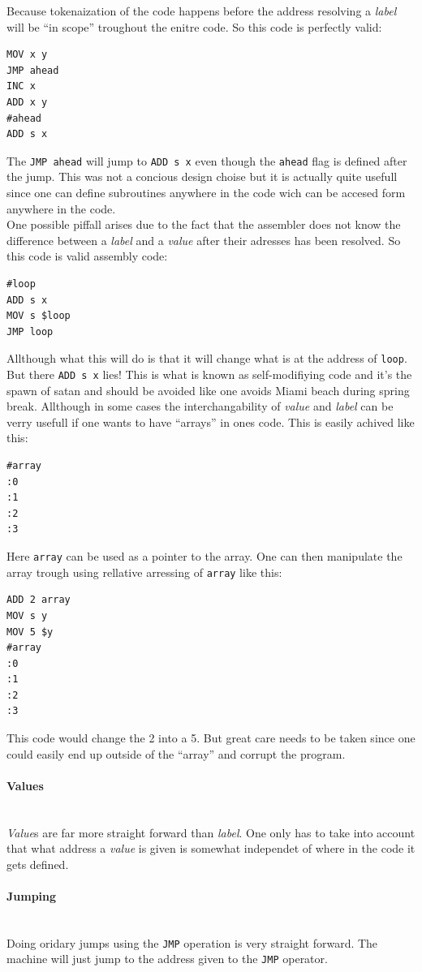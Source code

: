 \documentclass{article}
\newcommand{\V}{\verb}
\begin{document}
Because tokenaization of the code happens before the address resolving a \emph{label}
will be ``in scope'' troughout the enitre code. So this code is perfectly valid:

\begin{verbatim}
MOV x y
JMP ahead
INC x
ADD x y
#ahead
ADD s x
\end{verbatim}
The \V+JMP ahead+ will jump to \V+ADD s x+ even though the \V+ahead+ flag is
defined after the jump. This was not a concious design choise but it is actually
quite usefull since one can define subroutines anywhere in the code wich can be
accesed form anywhere in the code.\\
One possible piffall arises due to the fact that the assembler does not know the
difference between a \emph{label} and a \emph{value} after their adresses has been resolved.
So this code is valid assembly code:
\begin{verbatim}
#loop
ADD s x
MOV s $loop
JMP loop
\end{verbatim}
Allthough what this will do is that it will change what is at the address of
\V+loop+. But there \V+ADD s x+ lies! This is what is known as self-modifiying
code and it's the spawn of satan and should be avoided like one avoids Miami
beach during spring break. Allthough in some cases the interchangability of
\emph{value} and \emph{label} can be verry usefull if one wants to have ``arrays'' in ones
code. This is easily achived like this:
\begin{verbatim}
#array
:0
:1
:2
:3
\end{verbatim}
Here \V+array+ can be used as a pointer to the array. One can then manipulate
the array trough using rellative arressing of \V+array+ like this:
\begin{verbatim}
ADD 2 array
MOV s y
MOV 5 $y
#array
:0
:1
:2
:3
\end{verbatim}
This code would change the 2 into a 5. But great care needs to be taken since
one could easily end up outside of the ``array'' and corrupt the program.

\paragraph{Values} \ 
\\
\emph{Value}s are far more straight forward than \emph{label}. One only has to
take into account that what address a \emph{value} is given is somewhat
independet of where in the code it gets defined.

\paragraph{Jumping} \
\\
Doing oridary jumps using the \V+JMP+ operation is very straight forward. The
machine will just jump to the address given to the \V+JMP+ operator.
\end{document}
